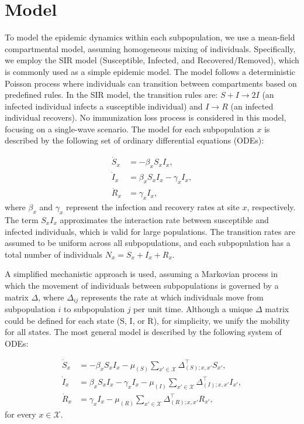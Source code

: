 

\section{Model}

To model the epidemic dynamics within each subpopulation, we use a mean-field compartmental model, assuming homogeneous mixing of individuals. Specifically, we employ the SIR model (Susceptible, Infected, and Recovered/Removed), which is commonly used as a simple epidemic model. The model follows a deterministic Poisson process where individuals can transition between compartments based on predefined rules. In the SIR model, the transition rules are: \( S + I \rightarrow 2I \) (an infected individual infects a susceptible individual) and \( I \rightarrow R \) (an infected individual recovers). No immunization loss process is considered in this model, focusing on a single-wave scenario. The model for each subpopulation \( x \) is described by the following set of ordinary differential equations (ODEs):

\begin{equation}
\begin{aligned}
    \dot{S}_{x} &= -\beta_{x} S_{x} I_{x}, \\
    \dot{I}_{x} &= \beta_{x} S_{x} I_{x} - \gamma_{x} I_{x}, \\
    \dot{R}_{x} &= \gamma_{x} I_{x},
\end{aligned}
\end{equation}
where \( \beta_x \) and \( \gamma_x \) represent the infection and recovery rates at site \( x \), respectively. The term \( S_x I_x \) approximates the interaction rate between susceptible and infected individuals, which is valid for large populations. The transition rates are assumed to be uniform across all subpopulations, and each subpopulation has a total number of individuals \( N_x = S_x + I_x + R_x \).

A simplified mechanistic approach is used, assuming a Markovian process in which the movement of individuals between subpopulations is governed by a matrix \( \Delta \), where \( \Delta_{ij} \) represents the rate at which individuals move from subpopulation \( i \) to subpopulation \( j \) per unit time. Although a unique \( \Delta \) matrix could be defined for each state (S, I, or R), for simplicity, we unify the mobility for all states. The most general model is described by the following system of ODEs:

\begin{equation}
\begin{aligned}
    \dot{S}_{x} &= -\beta_{x} S_{x} I_{x} - \mu_{(S)} \sum_{x' \in \mathcal{X}} \Delta_{(S);x,x'}^{\top} S_{x'}, \\
    \dot{I}_{x} &= \beta_{x} S_{x} I_{x} - \gamma_{x} I_{x} - \mu_{(I)} \sum_{x' \in \mathcal{X}} \Delta_{(I);x,x'}^{\top} I_{x'}, \\
    \dot{R}_{x} &= \gamma_{x} I_{x} - \mu_{(R)} \sum_{x' \in \mathcal{X}} \Delta_{(R);x,x'}^{\top} R_{x'},
\end{aligned}
\end{equation}
for every \( x \in \mathcal{X} \).

